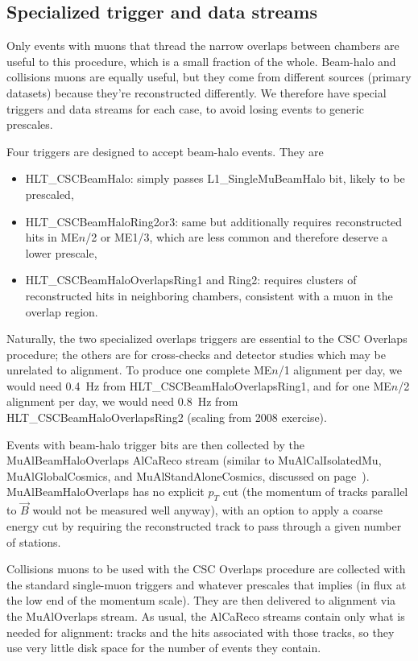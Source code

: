 \documentclass[12pt]{article}
\begin{document}
\subsection{Specialized trigger and data streams}

Only events with muons that thread the narrow overlaps between
chambers are useful to this procedure, which is a small fraction of
the whole.  Beam-halo and collisions muons are equally useful, but
they come from different sources (primary datasets) because they're
reconstructed differently.  We therefore have special triggers and
data streams for each case, to avoid losing events to generic
prescales.

Four triggers are designed to accept beam-halo events.  They are
\begin{itemize}
\item HLT\_CSCBeamHalo: simply passes L1\_SingleMuBeamHalo bit, likely
  to be prescaled,
\item HLT\_CSCBeamHaloRing2or3: same but additionally requires
  reconstructed hits in ME$n$/2 or ME1/3, which are less common and
  therefore deserve a lower prescale,
\item HLT\_CSCBeamHaloOverlapsRing1 and Ring2: requires clusters of
  reconstructed hits in neighboring chambers, consistent with a muon
  in the overlap region.
\end{itemize}
Naturally, the two specialized overlaps triggers are essential to the
CSC Overlaps procedure; the others are for cross-checks and detector
studies which may be unrelated to alignment.  To produce one complete
ME$n$/1 alignment per day, we would need 0.4~Hz from
HLT\_CSCBeamHaloOverlapsRing1, and for one ME$n$/2 alignment per day,
we would need 0.8~Hz from HLT\_CSCBeamHaloOverlapsRing2 (scaling from
2008 exercise).

Events with beam-halo trigger bits are then collected by the
MuAlBeamHaloOverlaps AlCaReco stream (similar to MuAlCalIsolatedMu,
MuAlGlobalCosmics, and MuAlStandAloneCosmics, discussed on
page~\pageref{page:AlCaReco}).  MuAlBeamHaloOverlaps has no explicit
$p_T$ cut (the momentum of tracks parallel to $\vec{B}$ would not be
measured well anyway), with an option to apply a coarse energy cut by
requiring the reconstructed track to pass through a given number of
stations.

Collisions muons to be used with the CSC Overlaps procedure are
collected with the standard single-muon triggers and whatever
prescales that implies (in flux at the low end of the momentum scale).
They are then delivered to alignment via the MuAlOverlaps stream.  As
usual, the AlCaReco streams contain only what is needed for alignment:
tracks and the hits associated with those tracks, so they use very
little disk space for the number of events they contain.
\end{document}
